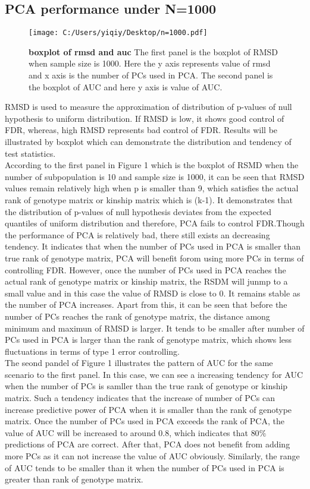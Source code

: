 \documentclass[12pt]{article}
\begin{document}
\subsection{PCA performance under N=1000}
\begin{figure}[bp!]
  \centering
  \texttt{[image: C:/Users/yiqiy/Desktop/n=1000.pdf]}
  \caption{
    {\bf boxplot of rmsd and auc}
    The first panel is the boxplot of RMSD when sample size is 1000. Here the y axis represents value of rmsd and x axis is the number of PCs used in PCA.
    The second panel is the boxplot of AUC and here y axis is value of AUC.}
  \label{fig:example}
\end{figure}
RMSD is used to measure the approximation of distribution of p-values of null hypothesis to uniform distribution. If RMSD is low, it shows good control of FDR, whereas, high RMSD represents bad control of FDR. Results will be illustrated by boxplot which can demonstrate the distribution and tendency of test statistics. \\
According to the first panel in Figure 1 which is the boxplot of RSMD when the number of subpopulation is 10 and sample size is 1000, it can be seen that RMSD values remain relatively high when p is smaller than 9, which satisfies the actual rank of genotype matrix or kinship matrix which is (k-1). It demonstrates that the distribution of p-values of null hypothesis deviates from the expected quantiles of uniform distribution and therefore, PCA fails to control FDR.Though the performance of PCA is relatively bad, there still exists an decreasing tendency. It indicates that when the number of PCs used in PCA is smaller than true rank of genotype matrix, PCA will benefit forom using more PCs in terms of controlling FDR. However, once the number of PCs used in PCA reaches the actual rank of genotype matrix or kinship matrix, the RSDM will junmp to a small value and in this case the value of RMSD is close to 0. It remains stable as the number of PCA increases. Apart from this, it can be seen that before the number of PCs reaches the rank of genotype matrix, the distance among minimum and maximun of RMSD is larger. It tends to be smaller after number of PCs used in PCA is larger than the rank of genotype matrix, which shows less fluctuations in terms of type 1 error controlling.\\

The seond pandel of Figure 1 illustrates the pattern of AUC for the same scenario to the first panel. In this case, we can see a increasing tendency for AUC when the number of PCs is samller than the true rank of genotype or kinship matrix. Such a tendency indicates that the increase of number of PCs can increase predictive power of PCA when it is smaller than the rank of genotype matrix. Once the number of PCs used in PCA exceeds the rank of PCA, the value of AUC will be increased to around 0.8, which indicates that $80\%$ predictions of PCA are correct. After that, PCA does not benefit from adding more PCs as it can not increase the value of AUC obviously. Similarly, the range of AUC tends to be smaller than it when the number of PCs used in PCA is greater than rank of genotype matrix. \\
\end{document}
